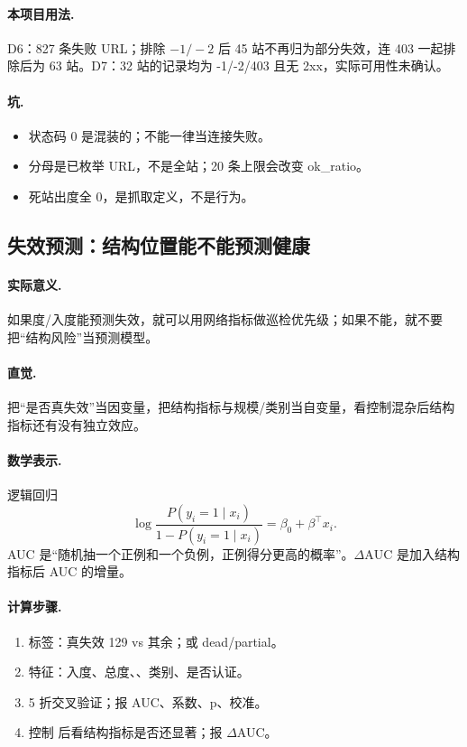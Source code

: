 \paragraph{本项目用法.}
\unit{D6}：827 条失败 URL；排除 \(-1/-2\) 后 45 站不再归为部分失效，连 403 一起排除后为 63 站。\unit{D7}：32 站的记录均为 -1/-2/403 且无 2xx，实际可用性未确认。

\paragraph{坑.}
\begin{itemize}
  \item 状态码 0 是混装的；不能一律当连接失败。
  \item 分母是已枚举 URL，不是全站；20 条上限会改变 ok\_ratio。
  \item 死站出度全 0，是抓取定义，不是行为。
\end{itemize}

\subsection{失效预测：结构位置能不能预测健康}

\paragraph{实际意义.}
如果度/入度能预测失效，就可以用网络指标做巡检优先级；如果不能，就不要把“结构风险”当预测模型。

\paragraph{直觉.}
把“是否真失效”当因变量，把结构指标与规模/类别当自变量，看控制混杂后结构指标还有没有独立效应。

\paragraph{数学表示.}
逻辑回归
\[
\log\frac{P(y_i=1\mid x_i)}{1-P(y_i=1\mid x_i)}
=\beta_0+\beta^\top x_i.
\]
AUC 是“随机抽一个正例和一个负例，正例得分更高的概率”。\(\Delta\mathrm{AUC}\) 是加入结构指标后 AUC 的增量。

\paragraph{计算步骤.}
\begin{enumerate}
  \item 标签：真失效 129 vs 其余；或 dead/partial。
  \item 特征：入度、总度、、类别、是否认证。
  \item 5 折交叉验证；报 AUC、系数、p、校准。
  \item 控制  后看结构指标是否还显著；报 \(\Delta\)AUC。
\end{enumerate}

